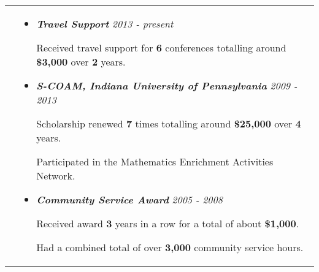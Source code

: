 \documentclass[10pt]{article}
\begin{document}
\vspace*{-\baselineskip}
\hskip-1.7in
\begin{tabularx}{1.5\linewidth}{>{\raggedleft\scshape}p{3cm}X}

  &\begin{itemize}
    \setlength\itemsep{.005em}  
          
\item \textbf{\textit{Travel Support}} \hspace{98.5 mm}\textit{2013 - present}
  
            Received travel support for \textbf{6} conferences totalling around \textbf{\$3,000} over \textbf{2} years.
                      
          
\item \textbf{\textit{S-COAM, Indiana University of Pennsylvania}} \hspace{42 mm}\textit{2009 - 2013}
  
            Scholarship renewed \textbf{7} times totalling around \textbf{\$25,000} over \textbf{4} years.
            
            Participated in the Mathematics Enrichment Activities Network.    
             

            \item \textbf{\textit{Community Service Award}} \hspace{77 mm}\textit{2005 - 2008}
  
            Received award \textbf{3} years in a row for a total of about \textbf{\$1,000}. 
            
            Had a combined total of over \textbf{3,000} community service hours.

             
  \end{itemize} 

\end{tabularx}
\end{document}
